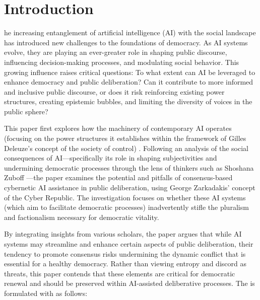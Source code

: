 %  

\chapter{Introduction}

he increasing entanglement of artificial intelligence (AI) with the social landscape has introduced new challenges to the foundations of democracy. As AI systems evolve, they are playing an ever-greater role in shaping public discourse, influencing decision-making processes, and modulating social behavior. This growing influence raises critical questions: To what extent can AI be leveraged to enhance democracy and public deliberation? Can it contribute to more informed and inclusive public discourse, or does it risk reinforcing existing power structures, creating epistemic bubbles, and limiting the diversity of voices in the public sphere?

This paper first explores how the machinery of contemporary AI operates (focusing on the power structures it establishes within the framework of Gilles Deleuze's concept of the society of control) \parencite*{deleuze1992a}. Following an analysis of the social consequences of AI—specifically its role in shaping subjectivities and undermining democratic processes through the lens of thinkers such as Shoshana Zuboff \parencite*{zuboff2019}—the paper examines the potential and pitfalls of consensus-based cybernetic AI assistance in public deliberation, using George Zarkadakis' \parencite*{zarkadakes2020} concept of the Cyber Republic. The investigation focuses on whether these AI systems (which aim to facilitate democratic processes) inadvertently stifle the pluralism and factionalism necessary for democratic vitality.

By integrating insights from various scholars, the paper argues that while AI systems may streamline and enhance certain aspects of public deliberation, their tendency to promote consensus risks undermining the dynamic conflict that is essential for a healthy democracy. Rather than viewing entropy and discord as threats, this paper contends that these elements are critical for democratic renewal and should be preserved within AI-assisted deliberative processes. The  is formulated with as follows:

